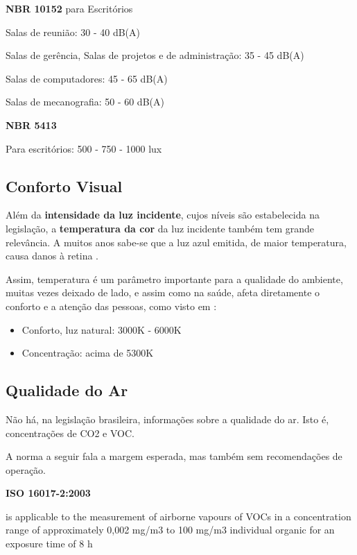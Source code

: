 \documentclass[../monografia.tex]{subfiles}
\begin{document}
\begin{citacaoLonga} %

\textbf{NBR 10152} \cite{NBR10152} para Escritórios

Salas de reunião: 30 - 40 dB(A)

Salas de gerência, Salas de projetos e de administração: 35 - 45 dB(A)

Salas de computadores: 45 - 65 dB(A)

Salas de mecanografia: 50 - 60 dB(A)

\textbf{NBR 5413} \cite{NBR5413}

Para escritórios: 500 - 750 - 1000 lux
\end{citacaoLonga}

\subsection{Conforto Visual} %
Além da \textbf{intensidade da luz incidente}, cujos níveis são estabelecida na legislação, a \textbf{temperatura da cor} da luz incidente também tem grande relevância. A muitos anos sabe-se que a luz azul emitida, de maior temperatura, causa danos à retina \cite{BlueLight}. \par
Assim, temperatura é um parâmetro importante para a qualidade do ambiente, muitas vezes deixado de lado, e assim como na saúde, afeta diretamente o conforto e a atenção das pessoas, como visto em \cite{VisualComfort}: 
\begin{itemize}
\item Conforto, luz natural: 3000K - 6000K
\item Concentração: acima de 5300K 
\end{itemize}

\subsection{Qualidade do Ar} %

Não há, na legislação brasileira, informações sobre a qualidade do ar. Isto é, concentrações de CO2 e VOC. 

A norma a seguir fala a margem esperada, mas também sem recomendações de operação. 

\begin{citacaoLonga} %
\textbf{ISO 16017-2:2003}

is applicable to the measurement of airborne vapours of VOCs in a concentration range of approximately 0,002 mg/m3 to 100 mg/m3 individual organic for an exposure time of 8 h
\end{citacaoLonga}
\end{document}
